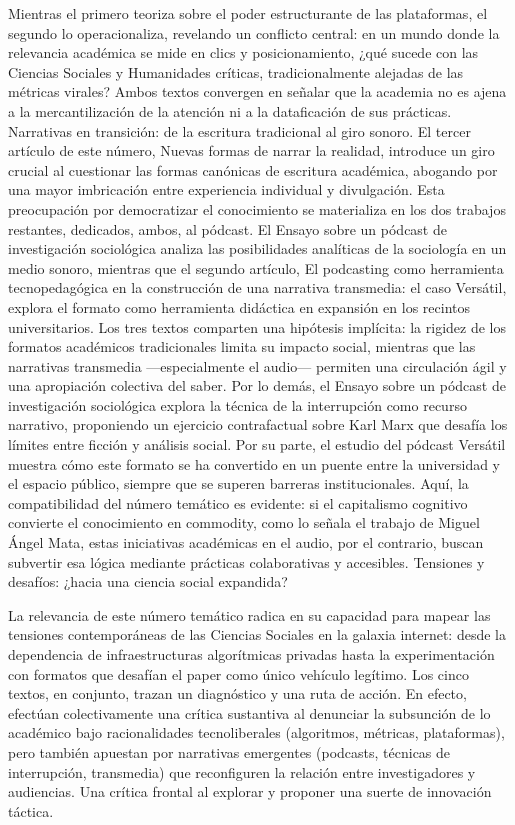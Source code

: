 \documentclass[
  letterpaper,
  DIV=11,
  numbers=noendperiod]{scrartcl}
\begin{document}
Mientras el primero teoriza sobre el poder estructurante de las
plataformas, el segundo lo operacionaliza, revelando un conflicto
central: en un mundo donde la relevancia académica se mide en clics y
posicionamiento, ¿qué sucede con las Ciencias Sociales y Humanidades
críticas, tradicionalmente alejadas de las métricas virales? Ambos
textos convergen en señalar que la academia no es ajena a la
mercantilización de la atención ni a la dataficación de sus prácticas.
Narrativas en transición: de la escritura tradicional al giro sonoro. El
tercer artículo de este número, Nuevas formas de narrar la realidad,
introduce un giro crucial al cuestionar las formas canónicas de
escritura académica, abogando por una mayor imbricación entre
experiencia individual y divulgación. Esta preocupación por democratizar
el conocimiento se materializa en los dos trabajos restantes, dedicados,
ambos, al pódcast. El Ensayo sobre un pódcast de investigación
sociológica analiza las posibilidades analíticas de la sociología en un
medio sonoro, mientras que el segundo artículo, El podcasting como
herramienta tecnopedagógica en la construcción de una narrativa
transmedia: el caso Versátil, explora el formato como herramienta
didáctica en expansión en los recintos universitarios. Los tres textos
comparten una hipótesis implícita: la rigidez de los formatos académicos
tradicionales limita su impacto social, mientras que las narrativas
transmedia ---especialmente el audio--- permiten una circulación ágil y
una apropiación colectiva del saber. Por lo demás, el Ensayo sobre un
pódcast de investigación sociológica explora la técnica de la
interrupción como recurso narrativo, proponiendo un ejercicio
contrafactual sobre Karl Marx que desafía los límites entre ficción y
análisis social. Por su parte, el estudio del pódcast Versátil muestra
cómo este formato se ha convertido en un puente entre la universidad y
el espacio público, siempre que se superen barreras institucionales.
Aquí, la compatibilidad del número temático es evidente: si el
capitalismo cognitivo convierte el conocimiento en commodity, como lo
señala el trabajo de Miguel Ángel Mata, estas iniciativas académicas en
el audio, por el contrario, buscan subvertir esa lógica mediante
prácticas colaborativas y accesibles. Tensiones y desafíos: ¿hacia una
ciencia social expandida?

La relevancia de este número temático radica en su capacidad para mapear
las tensiones contemporáneas de las Ciencias Sociales en la galaxia
internet: desde la dependencia de infraestructuras algorítmicas privadas
hasta la experimentación con formatos que desafían el paper como único
vehículo legítimo. Los cinco textos, en conjunto, trazan un diagnóstico
y una ruta de acción. En efecto, efectúan colectivamente una crítica
sustantiva al denunciar la subsunción de lo académico bajo
racionalidades tecnoliberales (algoritmos, métricas, plataformas), pero
también apuestan por narrativas emergentes (podcasts, técnicas de
interrupción, transmedia) que reconfiguren la relación entre
investigadores y audiencias. Una crítica frontal al explorar y proponer
una suerte de innovación táctica.
\end{document}

